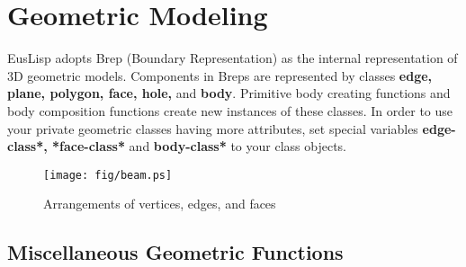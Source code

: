 \newpage
\section{\label{Geometry}Geometric Modeling}

EusLisp adopts {\emx Brep} (Boundary Representation) as the internal
representation of 3D geometric models.
Components in Breps are represented by classes
{\bf edge, plane, polygon, face, hole,} and {\bf body}.
Primitive body creating functions and body composition functions
create new instances of these classes.
In order to use your private geometric classes having
more attributes,
set special variables
{\bf *edge-class*, *face-class*} and {\bf *body-class*}
to your class objects.

\begin{figure}[htb]
\begin{center}
\texttt{[image: fig/beam.ps]}
\end{center}
\caption{Arrangements of vertices, edges, and faces}
\end{figure}

\subsection{Miscellaneous Geometric Functions}


